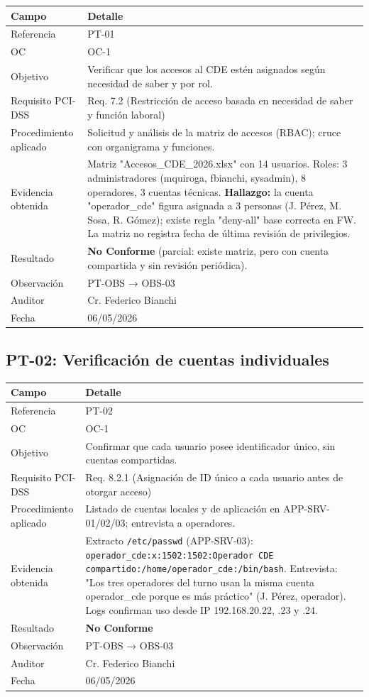 \documentclass[11pt,a4paper]{article}
\begin{document}
\begin{tabularx}{\textwidth}{P{5cm}L}
\toprule
\textbf{Campo} & \textbf{Detalle} \\
\midrule
Referencia & PT-01 \\
OC & OC-1 \\
Objetivo & Verificar que los accesos al CDE estén asignados según necesidad de saber y por rol. \\
Requisito PCI-DSS & Req. 7.2 (Restricción de acceso basada en necesidad de saber y función laboral) \\
Procedimiento aplicado & Solicitud y análisis de la matriz de accesos (RBAC); cruce con organigrama y funciones. \\
Evidencia obtenida & Matriz "Accesos_CDE_2026.xlsx" con 14 usuarios. Roles: 3 administradores (mquiroga, fbianchi, sysadmin), 8 operadores, 3 cuentas técnicas. \textbf{Hallazgo:} la cuenta "operador_cde" figura asignada a 3 personas (J. Pérez, M. Sosa, R. Gómez); existe regla "deny-all" base correcta en FW. La matriz no registra fecha de última revisión de privilegios. \\
Resultado & \textbf{No Conforme} (parcial: existe matriz, pero con cuenta compartida y sin revisión periódica). \\
Observación & PT-OBS → OBS-03 \\
Auditor & Cr. Federico Bianchi \\
Fecha & 06/05/2026 \\
\bottomrule
\end{tabularx}

\subsection{PT-02: Verificación de cuentas individuales}

\begin{tabularx}{\textwidth}{P{5cm}L}
\toprule
\textbf{Campo} & \textbf{Detalle} \\
\midrule
Referencia & PT-02 \\
OC & OC-1 \\
Objetivo & Confirmar que cada usuario posee identificador único, sin cuentas compartidas. \\
Requisito PCI-DSS & Req. 8.2.1 (Asignación de ID único a cada usuario antes de otorgar acceso) \\
Procedimiento aplicado & Listado de cuentas locales y de aplicación en APP-SRV-01/02/03; entrevista a operadores. \\
Evidencia obtenida & Extracto \texttt{/etc/passwd} (APP-SRV-03): \texttt{operador\_cde:x:1502:1502:Operador CDE compartido:/home/operador\_cde:/bin/bash}. Entrevista: "Los tres operadores del turno usan la misma cuenta operador_cde porque es más práctico" (J. Pérez, operador). Logs confirman uso desde IP 192.168.20.22, .23 y .24. \\
Resultado & \textbf{No Conforme} \\
Observación & PT-OBS → OBS-03 \\
Auditor & Cr. Federico Bianchi \\
Fecha & 06/05/2026 \\
\bottomrule
\end{tabularx}
\end{document}
